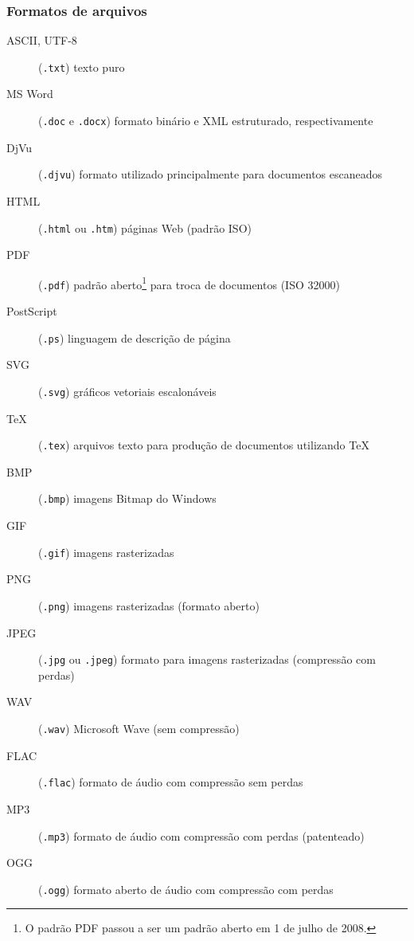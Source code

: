 \begin{frame}[allowframebreaks]
\frametitle{Formatos de arquivos}
\begin{description}
\item[ASCII, UTF-8](\texttt{.txt}) texto puro 
\item[MS Word](\texttt{.doc} e \texttt{.docx}) formato binário e XML estruturado, respectivamente
\item[DjVu](\texttt{.djvu}) formato utilizado principalmente para documentos escaneados
\item[HTML](\texttt{.html} ou \texttt{.htm}) páginas Web (padrão ISO)
\item[PDF](\texttt{.pdf}) padrão aberto\footnote{O padrão PDF passou a ser um padrão aberto em 1 de julho de 2008.} para troca de documentos (ISO 32000)
\item[PostScript](\texttt{.ps}) linguagem de descrição de página
\item[SVG](\texttt{.svg}) gráficos vetoriais escalonáveis
\item[TeX](\texttt{.tex}) arquivos texto para produção de documentos utilizando \TeX{}
\item[BMP](\texttt{.bmp}) imagens Bitmap do Windows
\item[GIF](\texttt{.gif}) imagens rasterizadas 
\item[PNG](\texttt{.png}) imagens rasterizadas (formato aberto)
\item[JPEG](\texttt{.jpg} ou \texttt{.jpeg}) formato para imagens rasterizadas (compressão com perdas)
\item[WAV](\texttt{.wav}) Microsoft Wave (sem compressão)
\item[FLAC](\texttt{.flac}) formato de áudio com compressão sem perdas
\item[MP3](\texttt{.mp3}) formato de áudio com compressão com perdas (patenteado)
\item[OGG](\texttt{.ogg}) formato aberto de áudio com compressão com perdas 
\end{description}
\end{frame}

